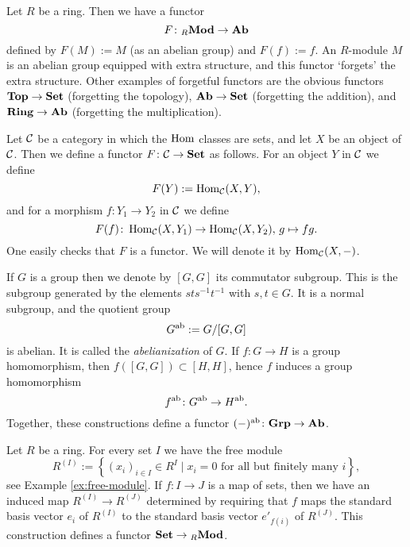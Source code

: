 \begin{example}\label{exa:forgetful}
Let $R$ be a ring. Then we have a functor
\[
	F\colon {}_R\mathbf{Mod} \to \mathbf{Ab}
\]
defined by $F(M):=M$ (as an abelian group) and $F(f):=f$. 
An $R$-module $M$ is an abelian group equipped with extra structure, and this functor `forgets' the extra structure. Other examples of forgetful functors are the obvious functors $\mathbf{Top} \to \mathbf{Set}$ (forgetting the topology), $\mathbf{Ab} \to \mathbf{Set}$ (forgetting the addition), and $\mathbf{Ring} \to \mathbf{Ab}$ (forgetting the multiplication).
\end{example}
 
\begin{example}\label{exa:covariant-hom-functor}
Let ${\mathcal{C}}$ be a category in which the $\operatorname{Hom}$ classes are sets, and let $X$ be an object of ${\mathcal{C}}$. Then we define a functor $F\colon {\mathcal{C}}\to \mathbf{Set}$ as follows. For an object $Y$ in ${\mathcal{C}}$ we define
\[
	F(Y) := \operatorname{Hom}_{\mathcal{C}}(X,Y),
\]
and for a morphism $f\colon Y_1 \to Y_2$ in ${\mathcal{C}}$ we define
\[
	F(f) \colon \operatorname{Hom}_{\mathcal{C}}(X,Y_1) \to \operatorname{Hom}_{\mathcal{C}}(X,Y_2),\, g \mapsto fg.
\]
One easily checks that $F$ is a functor. We  will denote it by $\operatorname{Hom}_{\mathcal{C}}(X,-)$.
\end{example}


\begin{example}\label{exa:abelianization}
If $G$ is a group then we denote by $[G,G]$ its commutator subgroup. This is the subgroup generated by the elements $sts^{-1}t^{-1}$ with $s,t\in G$. It is a normal subgroup, and the quotient group
\[
	G^{\mathrm{ab}} := G/[G,G]
\]
is abelian. It is called the \emph{abelianization} of $G$. If $f\colon G\to H$ is a group homomorphism, then $f([G,G]) \subset [H,H]$,  hence $f$ induces a group homomorphism 
\[
	f^{\mathrm{ab}} \colon G^{\mathrm{ab}} \to H^{\mathrm{ab}}.
\]
Together, these constructions define a functor $(-)^{\mathrm{ab}}\colon \mathbf{Grp}\to\mathbf{Ab}$.
\end{example}

\begin{example}\label{exa:free-module-functor}
Let $R$ be a ring. For every set $I$ we have the free module 
\[
	R^{(I)} := \left\{ (x_i)_{i\in I} \in R^I \mid \text{$x_i=0$ for all but finitely many $i$} \right\},
\]
see Example \ref{ex:free-module}. If $f\colon I\to J$ is a map of sets, then we have an induced map
$R^{(I)} \to R^{(J)}$ 
determined by requiring that $f$ maps the standard basis vector $e_i$ of $R^{(I)}$ to the standard basis vector $e'_{f(i)}$ of $R^{(J)}$. This construction defines a functor $\mathbf{Set} \to {}_R\mathbf{Mod}$.
\end{example}



